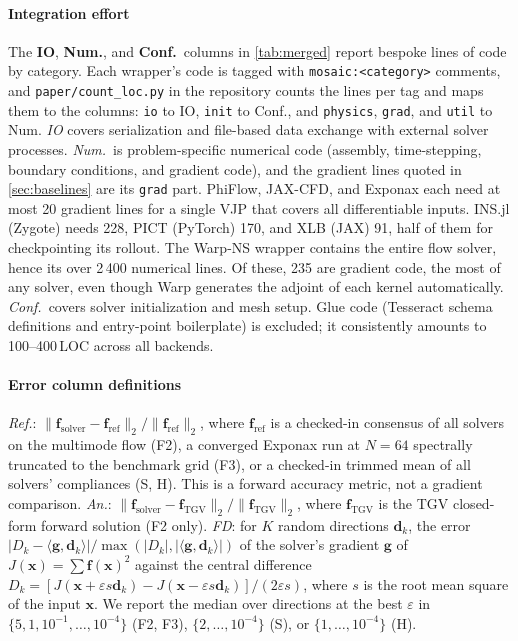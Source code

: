 \paragraph{Integration effort}
The \textbf{IO}, \textbf{Num.}, and \textbf{Conf.}\ columns in \cref{tab:merged}
report bespoke lines of code by category.
Each wrapper's code is tagged with \texttt{mosaic:<category>} comments, and
\texttt{paper/count\_loc.py} in the repository counts the lines per tag and maps them
to the columns: \texttt{io} to IO, \texttt{init} to Conf., and \texttt{physics},
\texttt{grad}, and \texttt{util} to Num.
\emph{IO} covers serialization and file-based data exchange with external solver processes.
\emph{Num.}\ is problem-specific numerical code (assembly, time-stepping, boundary
conditions, and gradient code), and the gradient lines quoted in \cref{sec:baselines}
are its \texttt{grad} part.
PhiFlow, JAX-CFD, and Exponax each need at most 20 gradient lines for a single
VJP that covers all differentiable inputs. INS.jl (Zygote) needs 228, PICT
(PyTorch) 170, and XLB (JAX) 91, half of them for checkpointing its rollout.
The Warp-NS wrapper contains the entire flow solver, hence its over 2\,400
numerical lines. Of these, 235 are gradient code, the most of any solver, even
though Warp generates the adjoint of each kernel automatically.
\emph{Conf.}\ covers solver initialization and mesh setup.
Glue code (Tesseract schema definitions and entry-point boilerplate) is excluded; it
consistently amounts to 100--400\,LOC across all backends.

\paragraph{Error column definitions}
\textit{Ref.}: $\|\mathbf{f}_{\text{solver}} - \mathbf{f}_{\text{ref}}\|_2 / \|\mathbf{f}_{\text{ref}}\|_2$,
where $\mathbf{f}_{\text{ref}}$ is a checked-in consensus of all solvers on the multimode
flow (F2), a converged Exponax run at $N=64$ spectrally truncated to the benchmark grid
(F3), or a checked-in trimmed mean of all solvers' compliances (S, H).
This is a forward accuracy metric, not a gradient comparison.
\textit{An.}: $\|\mathbf{f}_{\text{solver}} - \mathbf{f}_{\text{TGV}}\|_2 / \|\mathbf{f}_{\text{TGV}}\|_2$,
where $\mathbf{f}_{\text{TGV}}$ is the TGV closed-form forward solution (F2 only).
\textit{FD}: for $K$ random directions $\mathbf{d}_k$, the error
$|D_k - \langle \mathbf{g}, \mathbf{d}_k\rangle| / \max(|D_k|, |\langle \mathbf{g}, \mathbf{d}_k\rangle|)$
of the solver's gradient $\mathbf{g}$ of $J(\mathbf{x})=\sum \mathbf{f}(\mathbf{x})^2$
against the central difference
$D_k = [J(\mathbf{x}+\varepsilon s\mathbf{d}_k) - J(\mathbf{x}-\varepsilon s\mathbf{d}_k)]/(2\varepsilon s)$,
where $s$ is the root mean square of the input $\mathbf{x}$. We report the median over
directions at the best $\varepsilon$ in $\{5, 1, 10^{-1}, \ldots, 10^{-4}\}$ (F2, F3),
$\{2, \ldots, 10^{-4}\}$ (S), or $\{1, \ldots, 10^{-4}\}$ (H).

